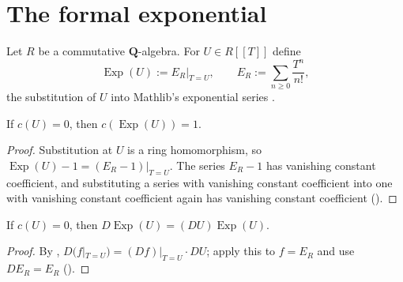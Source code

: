 \section{The formal exponential}
\label{sec:weil-formal-exp}

\begin{definition}
  \label{def:weil-formal-exp}
  \leanok

  Let $R$ be a commutative $\mathbf Q$-algebra.  For $U\in R[[T]]$ define
  \[
    \operatorname{Exp}(U):=E_R\big|_{T=U},
    \qquad E_R:=\sum_{n\ge0}\frac{T^n}{n!},
  \]
  the substitution of $U$ into Mathlib's exponential series
  \texttt{}.

\end{definition}

\begin{lemma}
  \label{lemma:weil-constant-coeff-exp}
  \leanok

  If $c(U)=0$, then $c(\operatorname{Exp}(U))=1$.
\end{lemma}

\begin{proof}
  \leanok
  Substitution at $U$ is a ring homomorphism, so
  $\operatorname{Exp}(U)-1=(E_R-1)\big|_{T=U}$.  The series $E_R-1$ has
  vanishing constant coefficient, and substituting a series with vanishing
  constant coefficient into one with vanishing constant coefficient again has
  vanishing constant coefficient
  (\texttt{}).
\end{proof}

\begin{lemma}
  \label{lemma:weil-derivative-exp}
  \leanok

  If $c(U)=0$, then
  $D\operatorname{Exp}(U)=(DU)\operatorname{Exp}(U)$.
\end{lemma}

\begin{proof}
  \leanok
  By \texttt{}, $D(f|_{T=U})
  =(Df)|_{T=U}\cdot DU$; apply this to $f=E_R$ and use
  $DE_R=E_R$ (\texttt{}).
\end{proof}

